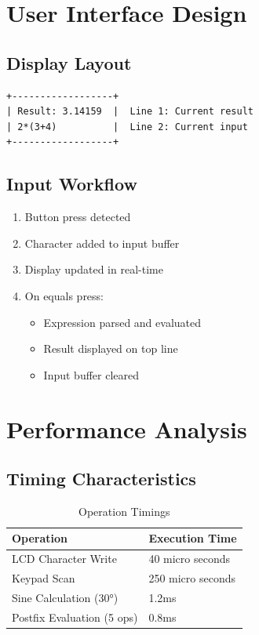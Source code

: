 \documentclass{article}
\begin{document}
\section{User Interface Design}
\subsection{Display Layout}

\begin{verbatim}
+------------------+
| Result: 3.14159  |  Line 1: Current result
| 2*(3+4)          |  Line 2: Current input
+------------------+
\end{verbatim}

\subsection{Input Workflow}

\begin{enumerate}
\item Button press detected
\item Character added to input buffer
\item Display updated in real-time
\item On equals press:
  \begin{itemize}
  \item Expression parsed and evaluated
  \item Result displayed on top line
  \item Input buffer cleared
  \end{itemize}
\end{enumerate}

\section{Performance Analysis}
\subsection{Timing Characteristics}

\begin{table}[h]
\centering
\caption{Operation Timings}
\begin{tabular}{|l|l|}
\hline
\textbf{Operation} & \textbf{Execution Time} \\
\hline
LCD Character Write & 40 micro seconds \\
Keypad Scan & 250 micro seconds \\
Sine Calculation (30°) & 1.2ms \\
Postfix Evaluation (5 ops) & 0.8ms \\
\hline
\end{tabular}
\end{table}
\end{document}
